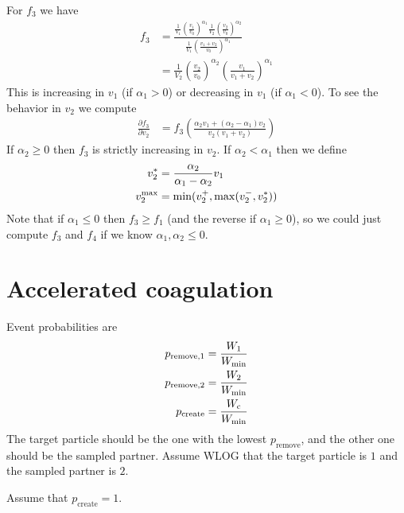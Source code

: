 \documentclass{article}
\begin{document}
For $f_3$ we have
\begin{align}
  f_3 &= \frac{\frac{1}{V_1} \left(\frac{v_1}{v_0}\right)^{\alpha_1}
      \frac{1}{V_2} \left(\frac{v_2}{v_0}\right)^{\alpha_2}}{
      \frac{1}{V_1} \left(\frac{v_1 + v_2}{v_0}\right)^{\alpha_1}} \\
    &= \frac{1}{V_2} \left(\frac{v_2}{v_0}\right)^{\alpha_2}
    \left(\frac{v_1}{v_1 + v_2}\right)^{\alpha_1}
\end{align}
This is increasing in $v_1$ (if $\alpha_1 > 0$) or decreasing in $v_1$
(if $\alpha_1 < 0$). To see the behavior in $v_2$ we compute
\begin{align}
  \frac{\partial f_3}{\partial v_2}
  &= f_3 \left(\frac{\alpha_2 v_1 + (\alpha_2 - \alpha_1) v_2}{
      v_2 (v_1 + v_2)}\right)
\end{align}
If $\alpha_2 \ge 0$ then $f_3$ is strictly increasing in $v_2$. If
$\alpha_2 < \alpha_1$ then we define
\begin{align}
  v_2^* &= \frac{\alpha_2}{\alpha_1 - \alpha_2} v_1 \\
  v_2^{\rm max} &= \min(v_2^+, \max(v_2^-, v_2^*))
\end{align}
Note that if $\alpha_1 \le 0$ then $f_3 \ge f_1$ (and the reverse if
$\alpha_1 \ge 0$), so we could just compute $f_3$ and $f_4$ if we know
$\alpha_1,\alpha_2 \le 0$.

\section{Accelerated coagulation}

Event probabilities are
\begin{align}
  p_{\text{remove},1} &= \frac{W_1}{W_{\rm min}} \\
  p_{\text{remove},2} &= \frac{W_2}{W_{\rm min}} \\
  p_{\text{create}} &= \frac{W_{\rm c}}{W_{\rm min}}
\end{align}
The target particle should be the one with the lowest
$p_{\text{remove}}$, and the other one should be the sampled
partner. Assume WLOG that the target particle is $1$ and the sampled
partner is $2$.

Assume that $p_{\text{create}} = 1$.
\end{document}
